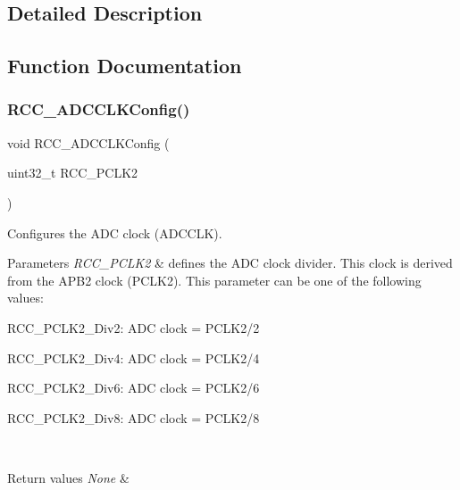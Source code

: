 \subsection{Detailed Description}


\subsection{Function Documentation}
\mbox{\label{group___r_c_c___private___functions_gadda89cdb838bf49e5fa10f3f774530a4}} 
\subsubsection{\texorpdfstring{RCC\_ADCCLKConfig()}{RCC\_ADCCLKConfig()}}
{\footnotesize\ttfamily void R\+C\+C\+\_\+\+A\+D\+C\+C\+L\+K\+Config (\begin{DoxyParamCaption}\item[{uint32\+\_\+t}]{R\+C\+C\+\_\+\+P\+C\+L\+K2 }\end{DoxyParamCaption})}



Configures the A\+DC clock (A\+D\+C\+C\+LK). 


\begin{DoxyParams}{Parameters}
{\em R\+C\+C\+\_\+\+P\+C\+L\+K2} & defines the A\+DC clock divider. This clock is derived from the A\+P\+B2 clock (P\+C\+L\+K2). This parameter can be one of the following values\+: \begin{DoxyItemize}
\item R\+C\+C\+\_\+\+P\+C\+L\+K2\+\_\+\+Div2\+: A\+DC clock = P\+C\+L\+K2/2 \item R\+C\+C\+\_\+\+P\+C\+L\+K2\+\_\+\+Div4\+: A\+DC clock = P\+C\+L\+K2/4 \item R\+C\+C\+\_\+\+P\+C\+L\+K2\+\_\+\+Div6\+: A\+DC clock = P\+C\+L\+K2/6 \item R\+C\+C\+\_\+\+P\+C\+L\+K2\+\_\+\+Div8\+: A\+DC clock = P\+C\+L\+K2/8 \end{DoxyItemize}
\\
\hline
\end{DoxyParams}

\begin{DoxyRetVals}{Return values}
{\em None} & \\
\hline
\end{DoxyRetVals}
\mbox{\label{group___r_c_c___private___functions_gaa2d6a35f5c2e0f86317c3beb222677fc}} 

